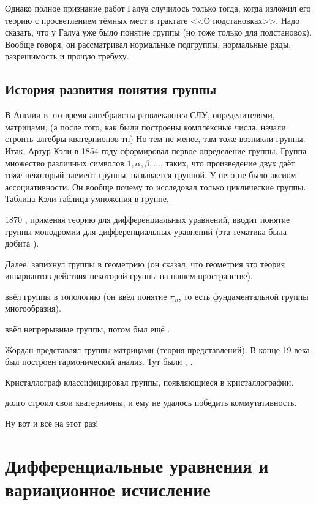\documentclass[a4paper,oneside,fleqn,10pt]{article}
\begin{document}
Однако полное признание работ Галуа случилось только тогда, когда  изложил
его теорию с просветлением тёмных мест в трактате <<О подстановках>>.
Надо сказать, что у Галуа уже было понятие группы (но тоже только для подстановок).
Вообще говоря, он рассматривал нормальные подгруппы, нормальные ряды,
разрешимость и прочую требуху.

\subsection{История развития понятия группы}

В Англии в это время алгебраисты развлекаются СЛУ, определителями, матрицами,
(а после того, как были построены комплексные числа, начали строить алгебры кватернионов тп)
Но тем не менее, там тоже возникли группы. Итак, Артур Кэли в 1854 году
сформировал первое определение группы.
Группа множество различных символов $1, \alpha, \beta,\ldots$, таких, что
произведение двух даёт тоже некоторый элемент группы, называется группой.
У него не было аксиом ассоциативности. Он вообще почему то исследовал
только циклические группы. Таблица Кэли таблица умножения в группе.

1870 , применяя теорию  для дифференциальных уравнений,
вводит понятие группы монодромии для дифференциальных уравнений (эта тематика была добита
).

Далее,  запихнул группы в геометрию (он сказал, что геометрия это теория инвариантов
действия некоторой группы на нашем пространстве).

 ввёл группы в топологию (он ввёл понятие $\pi_n$, то есть фундаментальной группы многообразия).

 ввёл непрерывные группы, потом был ещё .

Жордан представлял группы матрицами (теория представлений).
В конце 19 века был построен гармонический анализ.
Тут были , .

Кристаллограф  классифицировал группы, появляющиеся в кристаллографии.

 долго строил свои кватернионы, и ему не удалось победить коммутативность.

Ну вот и всё на этот раз!



\section{Дифференциальные уравнения и вариационное исчисление}
\end{document}
